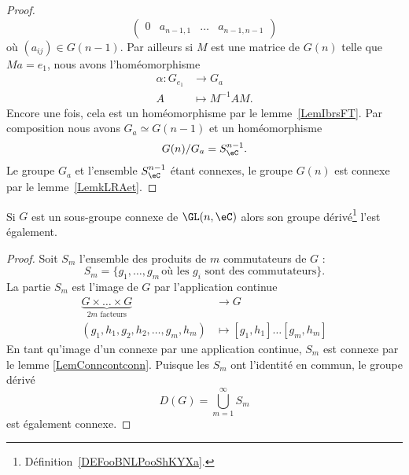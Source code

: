 \begin{proof}
\begin{equation}
\begin{pmatrix}
			0      & a_{n-1,1} & \ldots & a_{n-1,n-1}
		\end{pmatrix}
	\end{equation}
	où \( (a_{ij})\in G(n-1)\). Par ailleurs si \( M\) est une matrice de \( G(n)\) telle que \( Ma=e_1\), nous avons l'homéomorphisme
	\begin{equation}
		\begin{aligned}
			\alpha\colon G_{e_1} & \to G_a            \\
			A                    & \mapsto M^{-1} AM.
		\end{aligned}
	\end{equation}
	Encore une fois, cela est un homéomorphisme par le lemme~\ref{LemIbrsFT}. Par composition nous avons \( G_a\simeq G(n-1)\) et un homéomorphisme
	\begin{equation}
		G(n)/G_a=S^{n-1}_{\eC}.
	\end{equation}
	Le groupe \( G_a\) et l'ensemble \( S^{n-1}_{\eC}\) étant connexes, le groupe \( G(n)\) est connexe par le lemme~\ref{LemkLRAet}.
\end{proof}

\begin{lemma}
	Si \( G\) est un sous-groupe connexe de \( \GL(n,\eC)\) alors son groupe dérivé\footnote{Définition~\ref{DEFooBNLPooShKYXa}.} l'est également.
\end{lemma}

\begin{proof}
	Soit \( S_m\) l'ensemble des produits de \( m\) commutateurs de \( G\) :
	\begin{equation}
		S_m=\{ g_1,\ldots, g_m\,\text{où les } g_i\text{ sont des commutateurs} \}.
	\end{equation}
	La partie \( S_m\) est l'image de \( G\) par l'application continue
	\begin{equation}
		\begin{aligned}
			\underbrace{G\times \ldots\times G}_{ 2m\text{ facteurs}} & \to G                             \\
			(g_1,h_1,g_2,h_2,\ldots, g_m,h_m)                         & \mapsto [g_1,h_1]\ldots [g_m,h_m]
		\end{aligned}
	\end{equation}
	En tant qu'image d'un connexe par une application continue, \( S_m\) est connexe par le lemme \ref{LemConncontconn}. Puisque les \( S_m\) ont l'identité en commun, le groupe dérivé
	\begin{equation}
		D(G)=\bigcup_{m=1}^{\infty}S_m
	\end{equation}
	est également connexe.
\end{proof}

